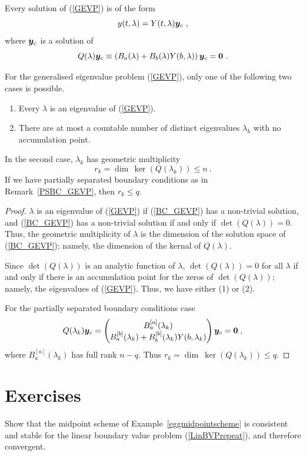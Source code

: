 Every solution of (\ref{GEVP}) is of the form
\[
y(t,\lambda) = Y(t,\lambda) \VEC{y}_c  \ ,
\]
where $\bm{y}_c$ is a solution of
\begin{equation} \label{BC_GEVP}
Q(\lambda) \bm{y}_c \equiv \left( B_a(\lambda) + B_b(\lambda)Y(b,\lambda)
\right) \bm{y}_c = \bm{0} \ .
\end{equation}

\begin{theorem}
For the generalised eigenvalue problem (\ref{GEVP}), only one of the
following two cases is possible.
\begin{enumerate}
\item Every $\lambda$ is an eigenvalue of (\ref{GEVP}).
\item There are at most a countable number of distinct eigenvalues
$\lambda_k$ with no accumulation point.
\end{enumerate}
In the second case, $\lambda_k$ has geometric multiplicity
\[
r_k = \dim\,\ker(Q(\lambda_k)) \leq n \ .
\]
If we have partially separated boundary conditions as in
Remark~\ref{PSBC_GEVP}, then $r_k \leq q$.
\end{theorem}

\begin{proof}
$\lambda$ is an eigenvalue of (\ref{GEVP}) if (\ref{BC_GEVP}) has a
non-trivial solution, and (\ref{BC_GEVP}) has a non-trivial solution
if and only if $\det(Q(\lambda))=0$.  Thus, the geometric multiplicity
of $\lambda$ is the dimension of the solution space of
(\ref{BC_GEVP}); namely, the dimension of the kernal of $Q(\lambda)$.

Since $\det(Q(\lambda))$ is an analytic function of $\lambda$,
$\det(Q(\lambda)) = 0$ for all $\lambda$ if and only if there is an
accumulation point for the zeros of $\det(Q(\lambda))$; namely, the
eigenvalues of (\ref{GEVP}).  Thus, we have either (1) or (2).

For the partially separated boundary conditions case
\[
Q(\lambda_k) \bm{y}_c = \begin{pmatrix}
B_a^{[a]}(\lambda_k) \\ B_a^{[b]}(\lambda_k) + B_b^{[b]}(\lambda_k)
Y(b,\lambda_k)
\end{pmatrix} \bm{y}_c = \bm{0} \; ,
\]
where $B_a^{[a]}(\lambda_k)$ has full rank $n-q$.
Thus $r_k = \dim\ \ker(Q(\lambda_k)) \leq q$.
\end{proof}

\section{Exercises}

\begin{question}
Show that the midpoint scheme of Example~\ref{eggmidpointscheme} is
consistent and stable for the linear boundary value problem
(\ref{LinBVPrepeat}), and therefore convergent.
\end{question}

